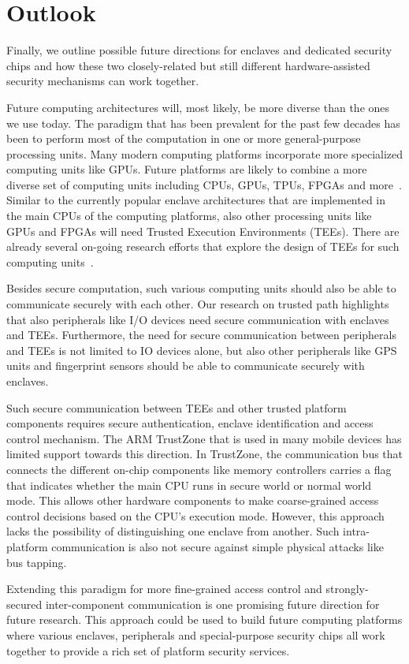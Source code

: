
\section*{Outlook}

Finally, we outline possible future directions for enclaves and dedicated security chips and how these two closely-related but still different hardware-assisted security mechanisms can work together.

Future computing architectures will, most likely, be more diverse than the ones we use today. The paradigm that has been prevalent for the past few decades has been to perform most of the computation in one or more general-purpose processing units. Many modern computing platforms incorporate more specialized computing units like GPUs. Future platforms are likely to combine a more diverse set of computing units including CPUs, GPUs, TPUs, FPGAs and more~\cite{dean2018new}. Similar to the currently popular enclave architectures that are implemented in the main CPUs of the computing platforms, also other processing units like GPUs and FPGAs will need Trusted Execution Environments (TEEs). There are already several on-going research efforts that explore the design of TEEs for such computing units~\cite{volos2018graviton}.

Besides secure computation, such various computing units should also be able to communicate securely with each other. Our research on trusted path highlights that also peripherals like I/O devices need secure communication with enclaves and TEEs. Furthermore, the need for secure communication between peripherals and TEEs is not limited to IO devices alone, but also other peripherals like GPS units and fingerprint sensors should be able to communicate securely with enclaves. 

Such secure communication between TEEs and other trusted platform components requires secure authentication, enclave identification and access control mechanism. The ARM TrustZone that is used in many mobile devices has limited support towards this direction. In TrustZone, the communication bus that connects the different on-chip components like memory controllers carries a flag that indicates whether the main CPU runs in secure world or normal world mode. This allows other hardware components to make coarse-grained access control decisions based on the CPU’s execution mode. However, this approach lacks the possibility of distinguishing one enclave from another. Such intra-platform communication is also not secure against simple physical attacks like bus tapping. 

Extending this paradigm for more fine-grained access control and strongly-secured inter-component communication is one promising future direction for future research. This approach could be used to build future computing platforms where various enclaves, peripherals and special-purpose security chips all work together to provide a rich set of platform security services.
